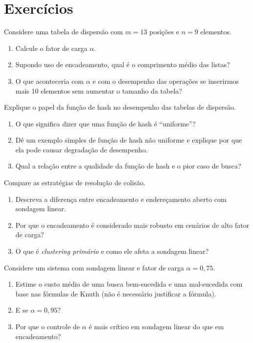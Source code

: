 \chapter{Exercícios}

\begin{exercicio}
Considere uma tabela de dispersão com $m = 13$ posições e $n = 9$ elementos.
\begin{enumerate}
  \item Calcule o fator de carga $\alpha$.
  \item Supondo uso de encadeamento, qual é o comprimento médio das listas?
  \item O que aconteceria com $\alpha$ e com o desempenho das operações se inserirmos mais 10 elementos sem aumentar o tamanho da tabela?
\end{enumerate}
\end{exercicio}

\begin{exercicio}
Explique o papel da função de hash no desempenho das tabelas de dispersão.
\begin{enumerate}
  \item O que significa dizer que uma função de hash é “uniforme”?
  \item Dê um exemplo simples de função de hash não uniforme e explique por que ela pode causar degradação de desempenho.
  \item Qual a relação entre a qualidade da função de hash e o pior caso de busca?
\end{enumerate}
\end{exercicio}

\begin{exercicio}
Compare as estratégias de resolução de colisão.
\begin{enumerate}
  \item Descreva a diferença entre encadeamento e endereçamento aberto com sondagem linear.
  \item Por que o encadeamento é considerado mais robusto em cenários de alto fator de carga?
  \item O que é \emph{clustering primário} e como ele afeta a sondagem linear?
\end{enumerate}
\end{exercicio}

\begin{exercicio}
Considere um sistema com sondagem linear e fator de carga $\alpha = 0{,}75$.
\begin{enumerate}
  \item Estime o custo médio de uma busca bem-sucedida e uma mal-sucedida com base nas fórmulas de Knuth (não é necessário justificar a fórmula).
  \item E se $\alpha = 0{,}95$?
  \item Por que o controle de $\alpha$ é mais crítico em sondagem linear do que em encadeamento?
\end{enumerate}
\end{exercicio}


